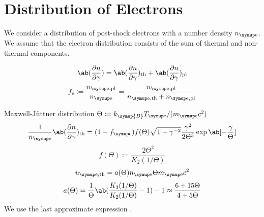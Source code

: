 \documentclass{notebook}
\begin{document}
\section{Distribution of Electrons}
We consider a distribution of post-shock electrons
with a number density \(n_{\ele}\).
We assume that the electron distribution consists of
the sum of thermal and non-thermal components.

\begin{equation}
  \ab(\pdv{n}{\gamma})
  =
  \ab(\pdv{n}{\gamma})_{\thermal}
  +
  \ab(\pdv{n}{\gamma})_{\powerlaw}
\end{equation}
\begin{equation}
  f_e
  \coloneq
  \frac{n_{\ele,\powerlaw}}{n_{\ele}}
  =
  \frac{
    n_{\ele,\powerlaw}
  }{
    n_{\ele,\thermal}+n_{\ele,\powerlaw}
  }
\end{equation}

Maxwell-J\"{u}ttner distribution
\(\Theta \coloneq k_{\symup{B}}T_{\ele}/(\melecc)\)
\begin{equation}
  \frac{1}{n_{\ele}}\ab(\pdv{n}{\gamma})_{\thermal}
  =
  (1-f_{\ele})
  f(\Theta)
  \sqrt{1-\gamma^{-2}}
  \frac{\gamma^2}{2\Theta^3}
  \exp\ab[-\frac{\gamma}{\Theta}]
\end{equation}
\begin{equation}
  f(\Theta)
  \coloneq
  \frac{2\Theta^2}{K_2(1/\Theta)}
\end{equation}
\begin{equation}
  \label{eq:thermal_energy}
  u_{\ele,\thermal} = a(\Theta)n_{\ele}\Theta \melecc
\end{equation}
\begin{equation}
  a(\Theta) 
  =
  \frac{1}{\Theta}
  \ab(\frac{K_3(1/\Theta)}{K_2(1/\Theta)}-1)
  -1
  \approx
  \frac{6+15\Theta}{4+5\Theta}
\end{equation}
We use the last approximate expression
\cite{gammieAdvectiondominatedAccretionFlows1998}
.
\end{document}
